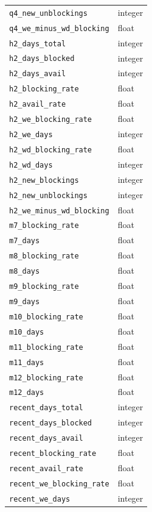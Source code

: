 \documentclass[journal]{IEEEtran}
\begin{document}
\begin{longtable}{p{2.2in}p{0.8in}}
\texttt{q4\_new\_unblockings} & integer \\
\texttt{q4\_we\_minus\_wd\_blocking} & float \\
\texttt{h2\_days\_total} & integer \\
\texttt{h2\_days\_blocked} & integer \\
\texttt{h2\_days\_avail} & integer \\
\texttt{h2\_blocking\_rate} & float \\
\texttt{h2\_avail\_rate} & float \\
\texttt{h2\_we\_blocking\_rate} & float \\
\texttt{h2\_we\_days} & integer \\
\texttt{h2\_wd\_blocking\_rate} & float \\
\texttt{h2\_wd\_days} & integer \\
\texttt{h2\_new\_blockings} & integer \\
\texttt{h2\_new\_unblockings} & integer \\
\texttt{h2\_we\_minus\_wd\_blocking} & float \\
\texttt{m7\_blocking\_rate} & float \\
\texttt{m7\_days} & float \\
\texttt{m8\_blocking\_rate} & float \\
\texttt{m8\_days} & float \\
\texttt{m9\_blocking\_rate} & float \\
\texttt{m9\_days} & float \\
\texttt{m10\_blocking\_rate} & float \\
\texttt{m10\_days} & float \\
\texttt{m11\_blocking\_rate} & float \\
\texttt{m11\_days} & float \\
\texttt{m12\_blocking\_rate} & float \\
\texttt{m12\_days} & float \\
\texttt{recent\_days\_total} & integer \\
\texttt{recent\_days\_blocked} & integer \\
\texttt{recent\_days\_avail} & integer \\
\texttt{recent\_blocking\_rate} & float \\
\texttt{recent\_avail\_rate} & float \\
\texttt{recent\_we\_blocking\_rate} & float \\
\texttt{recent\_we\_days} & integer \\

\end{longtable}
\end{document}
